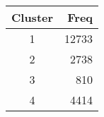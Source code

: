 
\begin{tabular}[t]{cr}
\toprule
Cluster & Freq\\
\midrule
1 & 12733\\
2 & 2738\\
3 & 810\\
4 & 4414\\
\bottomrule
\end{tabular}